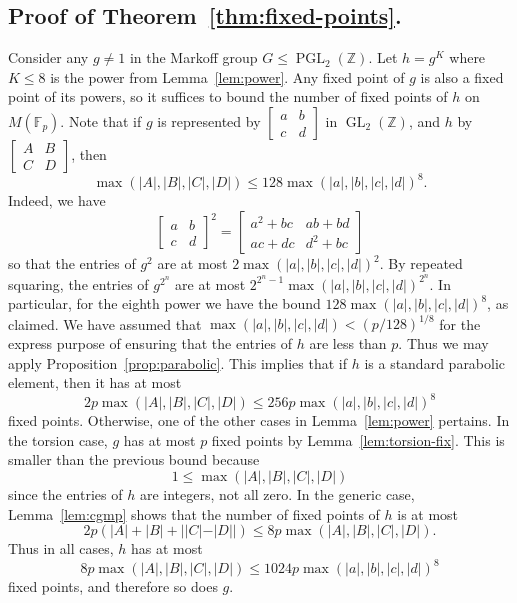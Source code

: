 \documentclass[AHL, Unicode, longabstracts, published]{cedram}
\newcommand{\Z}{\mathbb{Z}}
\newcommand{\F}{\mathbb{F}}
\DeclareMathOperator{\GL}{GL}
\DeclareMathOperator{\PGL}{PGL}
\DeclareMathOperator{\GL}{GL}
\newcommand{\Z}{\mathbb{Z}}
\begin{document}
\subsection{Proof of Theorem~\ref{thm:fixed-points}.} Consider any $g \neq 1$ in the Markoff group $G \leq \PGL_2(\Z)$. Let $h = g^K$ where $K \leq 8$ is the power from Lemma~\ref{lem:power}. Any fixed point of $g$ is also a fixed point of its powers, so it suffices to bound the number of fixed points of $h$ on $M(\F_p)$. Note that if $g$ is represented by $\left[
\begin{smallmatrix}
a & b \\ c & d
\end{smallmatrix}\right]$ in $\GL_2(\Z)$, and $h$ by $\left[
\begin{smallmatrix} A & B \\ C & D
\end{smallmatrix}\right]$, then
\[
\max(|A|,|B|,|C|,|D|) \leq 128 \max(|a|,|b|,|c|,|d|)^8.
\]
Indeed, we have
\[
\begin{bmatrix} a & b \\ c & d
\end{bmatrix}^2 =
\begin{bmatrix} a^2+bc & ab+bd \\ ac+dc & d^2+bc
\end{bmatrix}
\]
so that the entries of $g^2$ are at most $2\max(|a|,|b|,|c|,|d|)^2$. By repeated squaring, the entries of $g^{2^n}$ are at most $2^{2^n-1} \max(|a|,|b|,|c|,|d|)^{2^n}$. In particular, for the eighth power we have the bound $128 \max(|a|,|b|,|c|,|d|)^8$, as claimed. We have assumed that $\max(|a|,|b|,|c|,|d|) < (p/128)^{1/8}$ for the express purpose of ensuring that the entries of $h$ are less than $p$. Thus we may apply Proposition~\ref{prop:parabolic}. This implies that if $h$ is a standard parabolic element, then it has at most
\[
2p\max(|A|,|B|,|C|,|D|) \leq 256 p \max(|a|,|b|,|c|,|d|)^8
\]
fixed points. Otherwise, one of the other cases in Lemma~\ref{lem:power} pertains. In the torsion case, $g$ has at most $p$ fixed points by Lemma~\ref{lem:torsion-fix}. This is smaller than the previous bound because
\[
1 \leq \max(|A|,|B|,|C|,|D|)
\]
since the entries of $h$ are integers, not all zero. In the generic case, Lemma~\ref{lem:cgmp} shows that the number of fixed points of $h$ is at most
\[
2p(|A| + |B| + | |C| - |D| |) \leq 8p \max(|A|,|B|,|C|,|D|).
\]
Thus in all cases, $h$ has at most
\[
8p \max(|A|,|B|,|C|,|D|) \leq 1024 p \max(|a|,|b|,|c|,|d|)^8
\]
fixed points, and therefore so does $g$.
\end{document}
